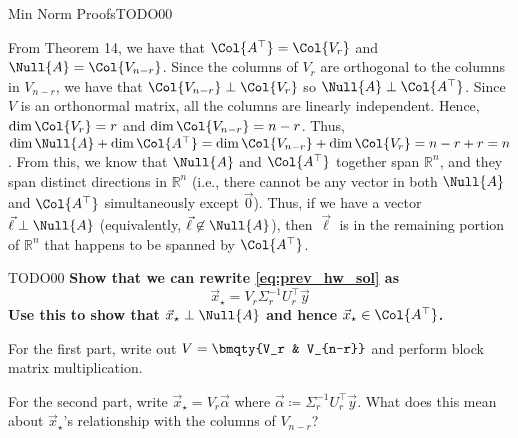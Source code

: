 \begin{problem}{Min Norm Proofs}{TODO}{0}{0}
\begin{problempartlist}
        \begin{solution}{0in}
            From Theorem 14, we have that $\Col{A^\top} = \Col{V_r}$ and $\Null{A} = \Col{V_{n-r}}$. Since the columns of $V_r$ are orthogonal to the columns in $V_{n-r}$, we have that $\Col{V_{n-r}} \perp \Col{V_r}$ so $\Null{A} \perp \Col{A^\top}$. Since $V$ is an orthonormal matrix, all the columns are linearly independent. Hence, $\dim{\Col{V_r}} = r$ and $\dim{\Col{V_{n-r}}} = n-r$. Thus, $\dim{\Null{A}} + \dim{\Col{A^\top}} = \dim{\Col{V_{n-r}}} + \dim{\Col{V_r}} = n - r + r = n$. From this, we know that $\Null{A}$ and $\Col{A^\top}$ together span $\mathbb{R}^n$, and they span distinct directions in $\mathbb{R}^n$ (i.e., there cannot be any vector in both $\Null{A}$ and $\Col{A^\top}$ simultaneously except $\vec{0}$). Thus, if we have a vector $\vec{\ell} \perp \Null{A}$ (equivalently, $\vec{\ell} \not \in \Null{A}$), then $\vec{\ell}$ is in the remaining portion of $\mathbb{R}^n$ that happens to be spanned by $\Col{A^\top}$.
        \end{solution}

        \begin{problempart}{TODO}{0}{0}
            \textbf{Show that we can rewrite \cref{eq:prev_hw_sol} as
            \begin{equation}
                \label{eq:compact_svd}
                \vec{x}_{\star} = V_r \Sigma_r^{-1} U_r^\top \vec{y}
            \end{equation}
            Use this to show that $\vec{x}_{\star} \perp \Null{A}$ and hence $\vec{x}_{\star} \in \Col{A^\top}$.}

            \begin{hint}
                For the first part, write out $V = \bmqty{V_r & V_{n-r}}$ and perform block matrix multiplication.
            \end{hint}
            \begin{hint}
                For the second part, write $\vec{x}_{\star} = V_r \vec{\alpha}$ where $\vec{\alpha} \coloneqq \Sigma_r^{-1} U_r^\top \vec{y}$. What does this mean about $\vec{x}_{\star}$'s relationship with the columns of $V_{n-r}$?
            \end{hint}
        \end{problempart}


\end{problempartlist}
\end{problem}
